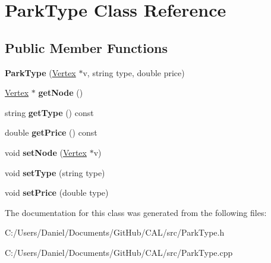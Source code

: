 \hypertarget{class_park_type}{}\section{Park\+Type Class Reference}
\label{class_park_type}
\subsection*{Public Member Functions}
\begin{DoxyCompactItemize}
\item 
\hypertarget{class_park_type_a803190d911a6d40fb29bdee515874210}{}\label{class_park_type_a803190d911a6d40fb29bdee515874210} 
{\bfseries Park\+Type} (\hyperlink{class_vertex}{Vertex} $\ast$v, string type, double price)
\item 
\hypertarget{class_park_type_a31551db20c7002622b8a04c3e430f91f}{}\label{class_park_type_a31551db20c7002622b8a04c3e430f91f} 
\hyperlink{class_vertex}{Vertex} $\ast$ {\bfseries get\+Node} ()
\item 
\hypertarget{class_park_type_a0cd72198dabae6bc7ecc5b1c00a69e62}{}\label{class_park_type_a0cd72198dabae6bc7ecc5b1c00a69e62} 
string {\bfseries get\+Type} () const
\item 
\hypertarget{class_park_type_a171c022c3a47800e7f6fdba3bfbf55a8}{}\label{class_park_type_a171c022c3a47800e7f6fdba3bfbf55a8} 
double {\bfseries get\+Price} () const
\item 
\hypertarget{class_park_type_a0f704067a159cd1c896256000ef5bcce}{}\label{class_park_type_a0f704067a159cd1c896256000ef5bcce} 
void {\bfseries set\+Node} (\hyperlink{class_vertex}{Vertex} $\ast$v)
\item 
\hypertarget{class_park_type_a4fdd5287a8874a81bded889dd25ba3ce}{}\label{class_park_type_a4fdd5287a8874a81bded889dd25ba3ce} 
void {\bfseries set\+Type} (string type)
\item 
\hypertarget{class_park_type_a000cd2df4d217992091171695a611b85}{}\label{class_park_type_a000cd2df4d217992091171695a611b85} 
void {\bfseries set\+Price} (double type)
\end{DoxyCompactItemize}


The documentation for this class was generated from the following files\+:\begin{DoxyCompactItemize}
\item 
C\+:/\+Users/\+Daniel/\+Documents/\+Git\+Hub/\+C\+A\+L/src/Park\+Type.\+h\item 
C\+:/\+Users/\+Daniel/\+Documents/\+Git\+Hub/\+C\+A\+L/src/Park\+Type.\+cpp\end{DoxyCompactItemize}
